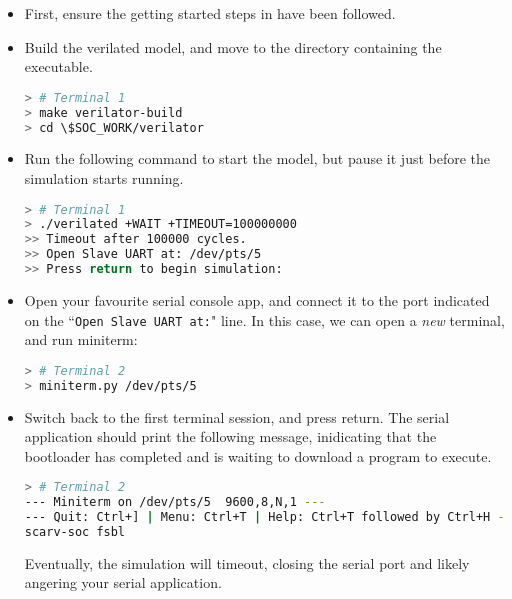 \begin{itemize}

\item First, ensure the getting started steps in
    have been followed.

\item Build the verilated model, and move to the directory containing
    the executable.

\begin{lstlisting}[language=bash,style=block]
> # Terminal 1
> make verilator-build
> cd \$SOC_WORK/verilator
\end{lstlisting}

\item Run the following command to start the model, but pause it just before
    the simulation starts running.

\begin{lstlisting}[language=bash,style=block]
> # Terminal 1
> ./verilated +WAIT +TIMEOUT=100000000
>> Timeout after 100000 cycles.
>> Open Slave UART at: /dev/pts/5
>> Press return to begin simulation:
\end{lstlisting}

\item Open your favourite serial console app, and connect it to
    the port indicated on the ``{\tt Open Slave UART at:}" line.
    In this case, we can open a {\em new} terminal, and run miniterm:

\begin{lstlisting}[language=bash,style=block]
> # Terminal 2
> miniterm.py /dev/pts/5
\end{lstlisting}

\item Switch back to the first terminal session, and press return.
    The serial application should print the following message,
    inidicating that the bootloader has completed and is waiting to
    download a program to execute.

\begin{lstlisting}[language=bash,style=block]
> # Terminal 2
--- Miniterm on /dev/pts/5  9600,8,N,1 ---
--- Quit: Ctrl+] | Menu: Ctrl+T | Help: Ctrl+T followed by Ctrl+H ---
scarv-soc fsbl
\end{lstlisting}

    Eventually, the simulation will timeout, closing the serial port
    and likely angering your serial application.

\end{itemize}

